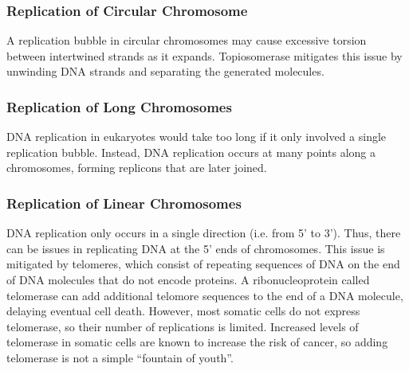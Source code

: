 \documentclass[12pt,titlepage]{article}
\begin{document}
        \subsubsection{Replication of Circular Chromosome}
          A replication bubble in circular chromosomes may cause excessive torsion between intertwined strands as it expands. Topiosomerase mitigates this issue by
          unwinding DNA strands and separating the generated molecules.

        \subsubsection{Replication of Long Chromosomes}
          DNA replication in eukaryotes would take too long if it only involved a single replication bubble. Instead, DNA replication occurs at many points along
          a chromosomes, forming replicons that are later joined.

        \subsubsection{Replication of Linear Chromosomes}
          DNA replication only occurs in a single direction (i.e. from 5' to 3'). Thus, there can be issues in replicating DNA at the 5' ends of chromosomes.
          This issue is mitigated by telomeres, which consist of repeating sequences of DNA on the end of DNA molecules that do not encode proteins. A
          ribonucleoprotein called telomerase can add additional telomore sequences to the end of a DNA molecule, delaying eventual cell death. However, most
          somatic cells do not express telomerase, so their number of replications is limited. Increased levels of telomerase in somatic cells are known to increase
          the risk of cancer, so adding telomerase is not a simple ``fountain of youth''.
\end{document}

